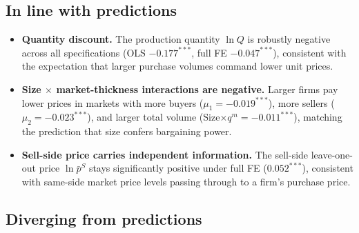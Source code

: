 \documentclass[12pt]{article}
\begin{document}
\subsection*{In line with predictions}

\begin{itemize}[leftmargin=1.5em,nosep]
  \item \textbf{Quantity discount.} The production quantity \(\ln Q\) is robustly
    negative across all specifications (OLS \(-0.177^{***}\), full FE
    \(-0.047^{***}\)), consistent with the expectation that larger purchase
    volumes command lower unit prices.
  \item \textbf{Size \(\times\) market-thickness interactions are negative.}
    Larger firms pay lower prices in markets with more buyers
    (\(\mu_1=-0.019^{***}\)), more sellers (\(\mu_2=-0.023^{***}\)), and larger
    total volume (Size\(\times q^m=-0.011^{***}\)), matching the prediction that
    size confers bargaining power.
  \item \textbf{Sell-side price carries independent information.} The sell-side
    leave-one-out price \(\ln\bar{p}^{S}\) stays significantly positive under full
    FE (\(0.052^{***}\)), consistent with same-side market price levels passing
    through to a firm's purchase price.
\end{itemize}

\subsection*{Diverging from predictions}
\end{document}
